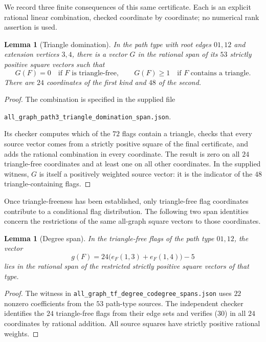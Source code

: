 \documentclass[11pt]{amsart}
\newtheorem{lemma}[theorem]{Lemma}
\theoremstyle{definition}
\theoremstyle{remark}
\begin{document}
We record three finite consequences of this same certificate. Each is an
explicit rational linear combination, checked coordinate by coordinate;
no numerical rank assertion is used.

\begin{lemma}[Triangle domination]\label{lem:triangle-domination}
In the path type with root edges \(01,12\) and extension vertices \(3,4\),
there is a vector \(G\) in the rational span of its \(53\) strictly
positive square vectors such that
\[
 G(F)=0\quad\text{if \(F\) is triangle-free},\qquad
 G(F)\ge1\quad\text{if \(F\) contains a triangle}.
\]
There are \(24\) coordinates of the first kind and \(48\) of the second.
\end{lemma}
\begin{proof}
The combination is specified in the supplied file
\begin{center}
 \texttt{all\_graph\_path3\_triangle\_domination\_span.json}.
\end{center}
Its checker computes which of the \(72\) flags contain a triangle,
checks that every source vector comes from a strictly positive square
of the final certificate, and adds the rational combination in every
coordinate. The result is zero on all \(24\) triangle-free coordinates
and at least one on all other coordinates. In the supplied witness,
\(G\) is itself a positively weighted source vector: it is the indicator
of the \(48\) triangle-containing flags.
\end{proof}

Once triangle-freeness has been established, only triangle-free flag
coordinates contribute to a conditional flag distribution. The following
two span identities concern the restrictions of the same all-graph square
vectors to those coordinates.

\begin{lemma}[Degree span]\label{lem:degree-span}
In the triangle-free flags of the path type \(01,12\), the vector
\begin{equation}
 g(F)=24\bigl(e_F(1,3)+e_F(1,4)\bigr)-5\tag{30}
\end{equation}
lies in the rational span of the restricted strictly positive square
vectors of that type.
\end{lemma}
\begin{proof}
The witness in
\texttt{all\_graph\_tf\_degree\_codegree\_spans.json} uses \(22\) nonzero
coefficients from the \(53\) path-type sources. The independent checker
identifies the \(24\) triangle-free flags from their edge sets and verifies
(30) in all \(24\) coordinates by rational addition. All source squares
have strictly positive rational weights.
\end{proof}
\end{document}
